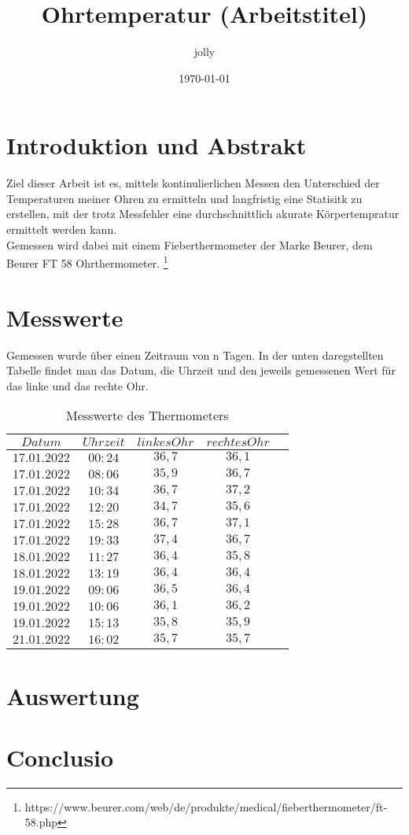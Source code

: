 \documentclass{article}
\title{Ohrtemperatur (Arbeitstitel)}
\author{jolly}
\date{\today}
\begin{document}
\maketitle
\newpage
\tableofcontents

\newpage
\section{Introduktion und Abstrakt}
Ziel dieser Arbeit ist es, mittels kontinulierlichen Messen den Unterschied der Temperaturen meiner Ohren zu  ermitteln und langfristig eine Statisitk zu erstellen, mit der trotz Messfehler eine durchschnittlich akurate Körpertempratur ermittelt werden kann. \\ Gemessen wird dabei mit einem Fieberthermometer der Marke Beurer, dem Beurer FT 58 Ohrthermometer. \footnote{https://www.beurer.com/web/de/produkte/medical/fieberthermometer/ft-58.php}

\newpage
\section{Messwerte}
Gemessen wurde über einen Zeitraum von n Tagen.
In der unten daregstellten Tabelle findet man das Datum, die Uhrzeit und den jeweils gemessenen Wert für das linke und das rechte Ohr.

\begin{table}[h!]
    \centering
    \begin{tabular}{c|c|c|c|c}
   $Datum $& $Uhrzeit $& $linkes Ohr $& $rechtes Ohr $ \\ \hline
    $17.01.2022$   & $00:24$ & $36,7$ &  $36,1$\\ \hline
    $17.01.2022$   & $08:06$ & $35,9$ &  $36,7$\\ \hline
    $17.01.2022$   & $10:34$ & $36,7$ &  $37,2$\\ \hline
    $17.01.2022$   & $12:20$ & $34,7$ & $35,6$ \\ \hline
    $17.01.2022$   & $15:28$ & $36,7$ & $37,1$\\ \hline
    $17.01.2022$   & $19:33$ & $37,4$ & $36,7$\\ \hline
    $18.01.2022$   & $11:27$ & $36,4$ & $35,8$\\ \hline
    $18.01.2022$   & $13:19$ & $36,4$ & $36,4$\\ \hline
    $19.01.2022$   & $09:06$ & $36,5$ & $36,4$\\ \hline
    $19.01.2022$   & $10:06$ & $36,1$ & $36,2$\\ \hline
    $19.01.2022$   & $15:13$ & $35,8$ & $35,9$\\ \hline
    $21.01.2022$   & $16:02$ & $35,7$ & $35,7$\\ \hline
    \end{tabular}
    \caption{Messwerte des Thermometers}
\end{table}

\newpage
\section{Auswertung}

\newpage
\section{Conclusio}
\end{document}
